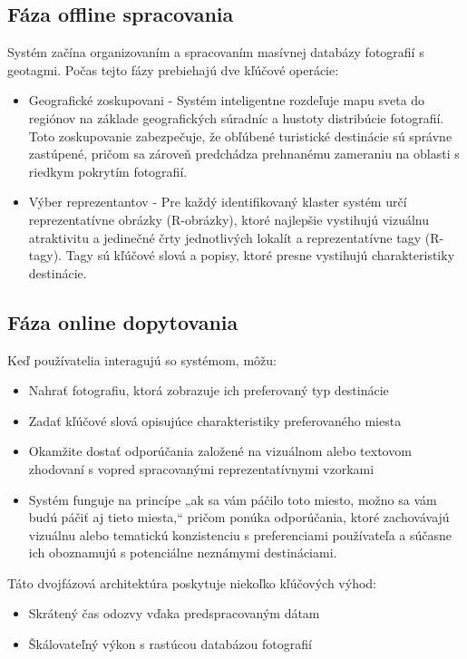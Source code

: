 \documentclass[10pt,twoside,slovak,a4paper]{article}
\begin{document}
\subsection{Fáza offline spracovania}
Systém začína organizovaním a spracovaním masívnej databázy fotografií s geotagmi. Počas tejto fázy prebiehajú dve kľúčové operácie:
\begin{itemize}
    \item Geografické zoskupovani - Systém inteligentne rozdeľuje mapu sveta do regiónov na základe geografických súradníc a hustoty distribúcie fotografií. Toto zoskupovanie zabezpečuje, že obľúbené turistické destinácie sú správne zastúpené, pričom sa zároveň predchádza prehnanému zameraniu na oblasti s riedkym pokrytím fotografií.
    \item Výber reprezentantov - Pre každý identifikovaný klaster systém určí reprezentatívne obrázky (R-obrázky), ktoré najlepšie vystihujú vizuálnu atraktivitu a jedinečné črty jednotlivých lokalít a reprezentatívne tagy (R-tagy). Tagy sú kľúčové slová a popisy, ktoré presne vystihujú charakteristiky destinácie.
\end{itemize}


\subsection{Fáza online dopytovania}
Keď používatelia interagujú so systémom, môžu:
\begin{itemize}
\item Nahrať fotografiu, ktorá zobrazuje ich preferovaný typ destinácie
\item Zadať kľúčové slová opisujúce charakteristiky preferovaného miesta
\item Okamžite dostať odporúčania založené na vizuálnom alebo textovom zhodovaní s vopred spracovanými reprezentatívnymi vzorkami
\item Systém funguje na princípe „ak sa vám páčilo toto miesto, možno sa vám budú páčiť aj tieto miesta,“ pričom ponúka odporúčania, ktoré zachovávajú vizuálnu alebo tematickú konzistenciu s preferenciami používateľa a súčasne ich oboznamujú s potenciálne neznámymi destináciami.
\end{itemize}

Táto dvojfázová architektúra poskytuje niekoľko kľúčových výhod:
\begin{itemize}
\item Skrátený čas odozvy vďaka predspracovaným dátam
\item Škálovateľný výkon s rastúcou databázou fotografií
\end{itemize}
\end{document}
